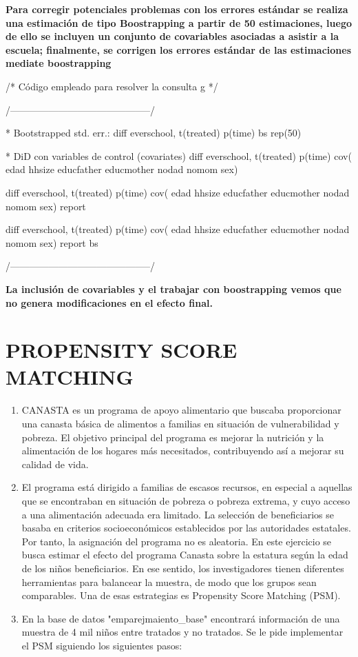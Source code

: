 \documentclass[12pt]{article}
\begin{document}
\textbf{Para corregir potenciales problemas con los errores estándar se realiza una estimación de tipo Boostrapping a partir de 50 estimaciones, luego de ello se incluyen un conjunto de covariables asociadas a asistir a la escuela; finalmente, se corrigen los errores estándar de las estimaciones mediate boostrapping}

\begin{statacode}
/* Código empleado para resolver la consulta g */ 

/--------------------------------------------/

* Bootstrapped std. err.:
diff everschool, t(treated) p(time) bs rep(50)

* DiD con variables de control (covariates)
diff everschool, t(treated) p(time) cov( edad hhsize educfather educmother nodad nomom  sex)

diff everschool, t(treated) p(time) cov( edad hhsize educfather educmother nodad nomom  sex) report

diff everschool, t(treated) p(time) cov( edad hhsize educfather educmother nodad nomom  sex) report bs

/--------------------------------------------/
\end{statacode}



\textbf{La inclusión de covariables y el trabajar con boostrapping vemos que no genera modificaciones en el efecto final.}


\newpage


\section{PROPENSITY SCORE MATCHING }
\begin{enumerate}
\item CANASTA es un programa de apoyo alimentario que buscaba proporcionar una canasta básica de alimentos a familias en situación de vulnerabilidad y pobreza. El objetivo principal del programa es mejorar la nutrición y la alimentación de los hogares más necesitados, contribuyendo así a mejorar su calidad de vida. 
\vspace{0.5cm}

\item El programa está dirigido a familias de escasos recursos, en especial a aquellas que se encontraban en situación de pobreza o pobreza extrema, y cuyo acceso a una alimentación adecuada era limitado. La selección de beneficiarios se basaba en criterios socioeconómicos establecidos por las autoridades estatales. Por tanto, la asignación del programa no es aleatoria. 
En este ejercicio se busca estimar el efecto del programa Canasta sobre la estatura según la edad de los niños beneficiarios. En ese sentido, los investigadores tienen diferentes herramientas para balancear la muestra, de modo que los grupos sean comparables. Una de esas estrategias es Propensity Score Matching (PSM).

\item En la base de datos "emparejmaiento\_base" encontrará información de una muestra de 4 mil niños entre tratados y no tratados. Se le pide implementar el PSM siguiendo los siguientes pasos: 
\end{enumerate}
\end{document}
